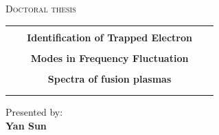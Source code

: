 \begin{titlepage}
\begin{center}
\vspace{0.5cm}
{\LARGE \textsc{Doctoral thesis\\}}



\vspace{0.8cm}

\begin{tabular}{c}
\noalign{\smallskip} \hline \hline \noalign{\smallskip}\\
{\huge \bf {{\Large~~~}Identification of Trapped Electron{\Large~~~}}}\\ \\
{\huge \bf {Modes in Frequency Fluctuation}}\\ \\
{\huge \bf {Spectra of fusion plasmas}}\\ \\





\noalign{\smallskip} \hline \hline \noalign{\smallskip}
\end{tabular}


\vspace{0.4cm}
{\Large
Presented by:\\ \vspace{.4cm}
\textbf{Yan Sun}}\\

\vspace{0.4cm}


\end{center}
\end{titlepage}
